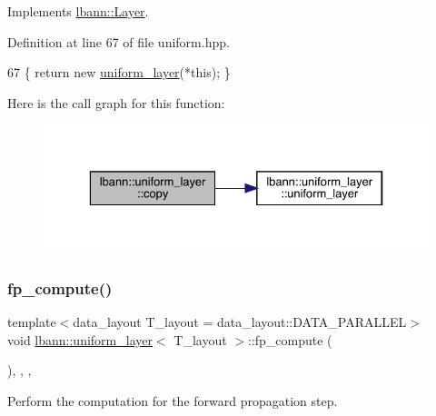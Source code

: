 Implements \hyperlink{classlbann_1_1Layer_af420f22bbac801c85483ade84588a23f}{lbann\+::\+Layer}.



Definition at line 67 of file uniform.\+hpp.


\begin{DoxyCode}
67 \{ \textcolor{keywordflow}{return} \textcolor{keyword}{new} \hyperlink{classlbann_1_1uniform__layer_a9ed147e3edd3d4556d0130a77a790f08}{uniform\_layer}(*\textcolor{keyword}{this}); \}
\end{DoxyCode}
Here is the call graph for this function\+:\nopagebreak
\begin{figure}[H]
\begin{center}
\leavevmode
\includegraphics[width=329pt]{classlbann_1_1uniform__layer_a3d148d514eaf8524a8ad3ec13ab69d59_cgraph}
\end{center}
\end{figure}
\mbox{\label{classlbann_1_1uniform__layer_a975ba9cfcd974fe348ee9681d1feb879}} 
\subsubsection{\texorpdfstring{fp\+\_\+compute()}{fp\_compute()}}
{\footnotesize\ttfamily template$<$data\+\_\+layout T\+\_\+layout = data\+\_\+layout\+::\+D\+A\+T\+A\+\_\+\+P\+A\+R\+A\+L\+L\+EL$>$ \\
void \hyperlink{classlbann_1_1uniform__layer}{lbann\+::uniform\+\_\+layer}$<$ T\+\_\+layout $>$\+::fp\+\_\+compute (\begin{DoxyParamCaption}{ }\end{DoxyParamCaption})\hspace{0.3cm}{\ttfamily [inline]}, {\ttfamily [override]}, {\ttfamily [protected]}, {\ttfamily [virtual]}}

Perform the computation for the forward propagation step. 


